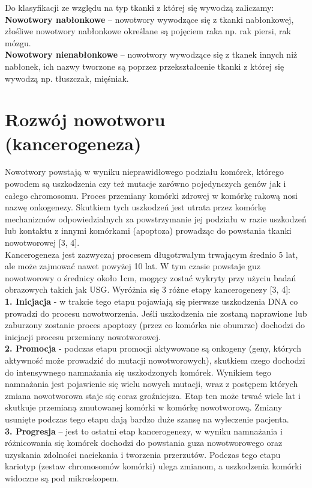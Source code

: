 \documentclass[a4paper,12pt,oneside]{book}
\begin{document}
Do klasyfikacji  ze względu na typ tkanki z której się wywodzą zaliczamy:\\
\textbf{Nowotwory nabłonkowe} – nowotwory wywodzące się z tkanki nabłonkowej, złośliwe nowotwory nabłonkowe określane są pojęciem raka np. rak piersi, rak mózgu.\\
\textbf{Nowotwory nienabłonkowe} – nowotwory wywodzące się z tkanek innych niż nabłonek, ich nazwy tworzone są poprzez przekształcenie tkanki z której się wywodzą np. tłuszczak, mięśniak.\\


\section{Rozwój nowotworu (kancerogeneza)}
Nowotwory powstają w wyniku nieprawidłowego podziału komórek, którego powodem są uszkodzenia czy też mutacje zarówno pojedynczych genów jak i całego chromosomu. Proces przemiany komórki zdrowej w komórkę rakową nosi nazwę onkogenezy.
Skutkiem tych uszkodzeń jest utrata przez komórkę mechanizmów odpowiedzialnych za powstrzymanie jej podziału w razie uszkodzeń lub kontaktu z innymi komórkami (apoptoza) prowadząc do powstania tkanki nowotworowej [3, 4].\\
Kancerogeneza jest zazwyczaj procesem długotrwałym trwającym średnio 5 lat, ale może zajmować nawet powyżej 10 lat. W tym czasie powstaje guz nowotworowy o średnicy około 1cm, mogący zostać wykryty przy użyciu badań obrazowych takich jak USG.
Wyróżnia się 3 różne etapy kancerogenezy [3, 4]:\\
\textbf{1. Inicjacja} - w trakcie tego etapu pojawiają się pierwsze uszkodzenia DNA co prowadzi do procesu nowotworzenia. Jeśli uszkodzenia nie zostaną naprawione lub zaburzony zostanie proces apoptozy (przez co komórka nie obumrze) dochodzi do inicjacji procesu przemiany nowotworowej.\\
\textbf{2. Promocja} - podczas etapu promocji aktywowane są onkogeny (geny, których aktywność może prowadzić do mutacji nowotworowych), skutkiem czego dochodzi do intensywnego namnażania się uszkodzonych komórek. Wynikiem tego namnażania jest pojawienie się wielu nowych mutacji, wraz z postępem których zmiana nowotworowa staje się coraz groźniejsza. Etap ten może trwać wiele lat i skutkuje  przemianą zmutowanej komórki w komórkę nowotworową. Zmiany usunięte podczas tego etapu dają bardzo duże szansę na wyleczenie pacjenta.\\
\textbf{3. Progresja} – jest to ostatni etap kancerogenezy, w wyniku namnażania i różnicowania się komórek dochodzi do powstania guza nowotworowego oraz uzyskania zdolności naciekania i tworzenia przerzutów. Podczas tego etapu kariotyp (zestaw chromosomów komórki) ulega zmianom, a uszkodzenia komórki widoczne są pod mikroskopem.\\
\end{document}
